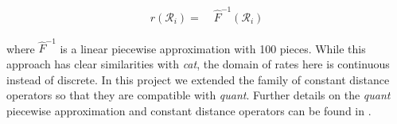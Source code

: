 \documentclass[10pt,letterpaper]{article}
\begin{document}
\begin{align}
r(\mathcal{R}_i) =& \; \hat{F}^{-1}(\mathcal{R}_i)
\end{align}

\noindent
where $\hat{F}^{-1}$ is a linear piecewise approximation with 100 pieces.
While this approach has clear similarities with \textit{cat}, the domain of rates here is continuous instead of discrete.
In this project we extended the family of constant distance operators  \cite{zhang2020improving} so that they are compatible with \textit{quant}.
Further details on the \textit{quant} piecewise approximation and constant distance operators can be found in \textbf{}. 














\end{document}
